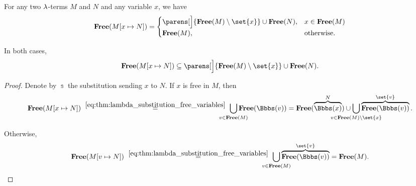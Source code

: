 \begin{corollary}\label{thm:lambda_substitution_free_variables_single}
  For any two \( {\mathrm \lambda} \)-terms \( M \) and \( N \) and any variable \( x \), we have
  \begin{equation}\label{eq:thm:lambda_substitution_free_variables_single}
    \op*{Free}( M[x \mapsto N] ) = \begin{cases}
      \parens[\Big]{ \op*{Free}(M) \setminus \set{ x } } \cup \op*{Free}(N), &x \in \op*{Free}(M) \\
      \op*{Free}(M),                                                         &\T{otherwise.}
    \end{cases}
  \end{equation}

  In both cases,
  \begin{equation}\label{eq:thm:lambda_substitution_free_variables_single/subset}
    \op*{Free}( M[x \mapsto N] ) \subseteq \parens[\Big]{ \op*{Free}(M) \setminus \set{ x } } \cup \op*{Free}(N).
  \end{equation}
\end{corollary}
\begin{proof}
  Denote by \( \Bbbs \) the substitution sending \( x \) to \( N \). If \( x \) is free in \( M \), then
  \begin{equation*}
    \op*{Free}(M[x \mapsto N])
    \reloset{\eqref{eq:thm:lambda_substitution_free_variables}} =
    \bigcup_{\mathclap{v \in \op*{Free}(M)}} \op*{Free}(\Bbbs(v))
    =
    \op*{Free}(\overbrace{\Bbbs(x)}^N) \cup \bigcup_{\mathclap{v \in \op*{Free}(M) \setminus \set{ x }}} \overbrace{\op*{Free}(\Bbbs(v))}^{\set{ v }}.
  \end{equation*}

  Otherwise,
  \begin{equation*}
    \op*{Free}(M[v \mapsto N])
    \reloset{\eqref{eq:thm:lambda_substitution_free_variables}} =
    \bigcup_{\mathclap{v \in \op*{Free}(M)}} \overbrace{\op*{Free}(\Bbbs(v))}^{\set{ v }}
    =
    \op*{Free}(M).
  \end{equation*}
\end{proof}

